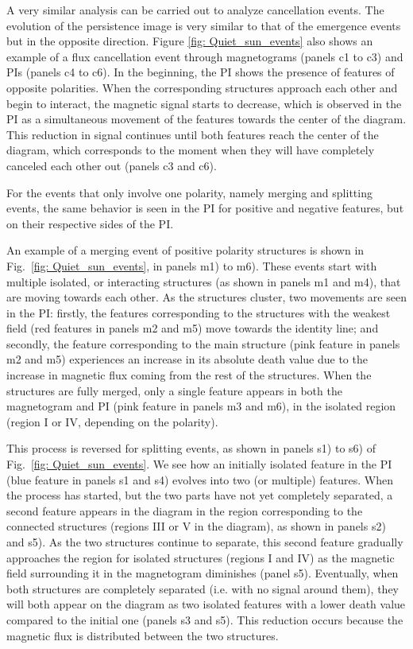 \documentclass[12pt]{mythesis}
\begin{document}
A very similar analysis can be carried out to analyze cancellation events. The evolution of the persistence image is very similar to that of the emergence events but in the opposite direction. Figure \ref{fig: Quiet_sun_events} also shows an example of a flux cancellation event through magnetograms (panels c1 to c3) and PIs (panels c4 to c6). In the beginning, the PI shows the presence of features of opposite polarities. When the corresponding structures approach each other and begin to interact, the magnetic signal starts to decrease, which is observed in the PI as a simultaneous movement of the features towards the center of the diagram. This reduction in signal continues until both features reach the center of the diagram, which corresponds to the moment when they will have completely canceled each other out (panels c3 and c6). 

For the events that only involve one polarity, namely merging and splitting events, the same behavior is seen in the PI for positive and negative features, but on their respective sides of the PI.

An example of a merging event of positive polarity structures is shown in Fig.~\ref{fig: Quiet_sun_events}, in panels m1) to m6). These events start with multiple isolated, or interacting structures (as shown in panels m1 and m4), that are moving towards each other. As the structures cluster, two movements are seen in the PI: firstly, the features corresponding to the structures with the weakest field (red features in panels m2 and m5) move towards the identity line; and secondly, the feature corresponding to the main structure (pink feature in panels m2 and m5) experiences an increase in its absolute death value due to the increase in magnetic flux coming from the rest of the structures. When the structures are fully merged, only a single feature appears in both the magnetogram and PI (pink feature in panels m3 and m6), in the isolated region (region I or IV, depending on the polarity).

This process is reversed for splitting events, as shown in panels s1) to s6) of Fig.~\ref{fig: Quiet_sun_events}. We see how an initially isolated feature in the PI (blue feature in panels s1 and s4) evolves into two (or multiple) features. When the process has started, but the two parts have not yet completely separated, a second feature appears in the diagram in the region corresponding to the connected structures (regions III or V in the diagram), as shown in panels s2) and s5). As the two structures continue to separate, this second feature gradually approaches the region for isolated structures (regions I and IV)  as the magnetic field surrounding it in the magnetogram diminishes (panel s5). Eventually, when both structures are completely separated (i.e. with no signal around them), they will both appear on the diagram as two isolated features with a lower death value compared to the initial one (panels s3 and s5). This reduction occurs because the magnetic flux is distributed between the two structures.
\end{document}
